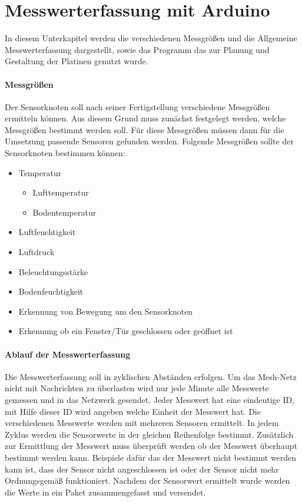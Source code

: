 \section{Messwerterfassung mit Arduino}
\label{sec:MesswerterfassungArduino}
In diesem Unterkapitel werden die verschiedenen Messgrößen und die Allgemeine Messwerterfassung dargestellt, sowie das Programm das zur Planung und Gestaltung der Platinen genutzt wurde.
\paragraph{Messgrößen} Der Sensorknoten soll nach seiner Fertigstellung verschiedene Messgrößen ermitteln können. Aus diesem Grund muss zunächst festgelegt werden, welche Messgrößen bestimmt werden soll. Für diese Messgrößen müssen dann für die Umsetzung passende Sensoren gefunden werden. Folgende Messgrößen sollte der Sensorknoten bestimmen können:
\begin{itemize}
	\item Temperatur
	\begin{itemize}
		\item Lufttemperatur
		\item Bodentemperatur 
	\end{itemize}
	\item Luftfeuchtigkeit
	\item Luftdruck
	\item Beleuchtungsstärke
	\item Bodenfeuchtigkeit
	\item Erkennung von Bewegung um den Sensorknoten
	\item Erkennung ob ein Fenster/Tür geschlossen oder geöffnet ist
\end{itemize}
\paragraph{Ablauf der Messwerterfassung} Die Messwerterfassung soll in zyklischen Abständen erfolgen. Um das Mesh-Netz nicht mit Nachrichten zu überlasten wird nur jede Minute alle Messwerte gemessen und in das Netzwerk gesendet.  Jeder Messwert hat eine eindeutige ID, mit Hilfe dieser ID wird angeben welche Einheit der Messwert hat. 
Die verschiedenen Messwerte werden mit mehreren Sensoren ermittelt. In jedem Zyklus werden die Sensorwerte in der gleichen Reihenfolge bestimmt. Zusätzlich zur Ermittlung der Messwert muss überprüft werden ob der Messwert überhaupt bestimmt werden kann. Beispiele dafür das der Messwert nicht  bestimmt werden kann ist, dass der Sensor nicht angeschlossen ist oder der Sensor nicht mehr Ordnungsgemäß funktioniert. 
Nachdem der Sensorwert ermittelt wurde werden die Werte in ein Paket zusammengefasst und versendet.  
